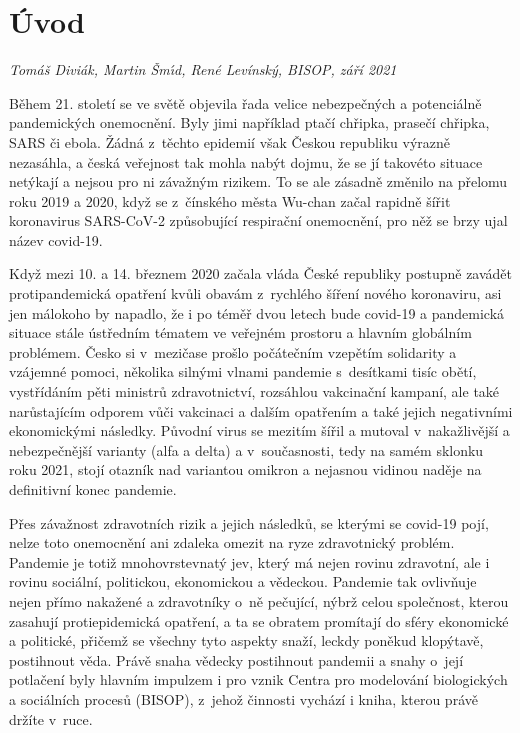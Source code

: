\chapter*{Úvod}

\textit{Tomáš Diviák, Martin \v Sm\'\i d, René Levínský, BISOP, září 2021}
\vspace{15mm}

\noindent Během 21. století se ve světě objevila řada velice nebezpečných a potenciálně pandemických onemocnění. Byly jimi například ptačí chřipka, prasečí chřipka, SARS či ebola. Žádná z~těchto epidemií však Českou republiku výrazně nezasáhla, a česká veřejnost tak mohla nabýt dojmu, že se jí takovéto situace netýkají a nejsou pro ni závažným rizikem. To se ale zásadně změnilo na přelomu roku 2019 a 2020, když se z~čínského města Wu-chan začal rapidně šířit koronavirus SARS-CoV-2 způsobující respirační onemocnění, pro něž se brzy ujal název covid-19.

Když mezi 10. a 14. březnem 2020 začala vláda České republiky postupně zavádět protipandemická opatření kvůli obavám z~rychlého šíření nového koronaviru, asi jen málokoho by napadlo, že i po téměř dvou letech bude covid-19 a pandemická situace stále ústředním tématem ve veřejném prostoru a hlavním globálním problémem. Česko si v~mezičase prošlo počátečním vzepětím solidarity a vzájemné pomoci, několika silnými vlnami pandemie s~desítkami tisíc obětí, vystřídáním pěti ministrů zdravotnictví, rozsáhlou vakcinační kampaní, ale také narůstajícím odporem vůči vakcinaci a dalším opatřením a také jejich negativními ekonomickými následky. Původní virus se mezitím šířil a mutoval v~nakažlivější a nebezpečnější varianty (alfa a delta) a v~současnosti, tedy na samém sklonku roku 2021, stojí otazník nad variantou omikron a nejasnou vidinou naděje na definitivní konec pandemie.

Přes závažnost zdravotních rizik a jejich následků, se kterými se covid-19 pojí, nelze toto onemocnění ani zdaleka omezit na ryze zdravotnický problém. Pandemie je totiž mnohovrstevnatý jev, který má nejen rovinu zdravotní, ale i rovinu sociální, politickou, ekonomickou a vědeckou. Pandemie tak ovlivňuje nejen přímo nakažené a zdravotníky o~ně pečující, nýbrž celou společnost, kterou zasahují protiepidemická opatření, a ta se obratem promítají do sféry ekonomické a politické, přičemž se všechny tyto aspekty snaží, leckdy poněkud klopýtavě, postihnout věda. \newpage Právě snaha vědecky postihnout pandemii a snahy o~její potlačení byly hlavním impulzem i pro vznik Centra pro modelování biologických a sociálních procesů (BISOP), z~jehož činnosti vychází i kniha, kterou právě držíte v~ruce.

